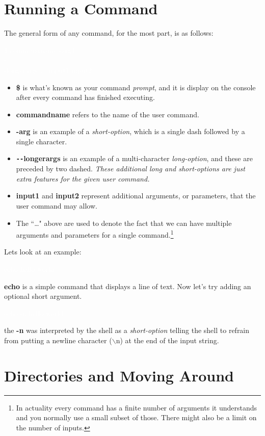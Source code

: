 \documentclass[oneside]{book}
\newcommand{\commandline}[1]{\begin{center} \colorbox{Dark}{\textcolor{white}{#1}} \end{center}}
\begin{document}
\section{Running a Command}
The general form of any command, for the most part, is as follows:
\commandline{\$ commandname -arg1 ... \ \\-\\-longerargs ... input1 input2 ...}
\begin{itemize}
    \item \textbf{\$} is what's known as your command \textit{prompt}, and it is display on the console after every command has finished executing.
    \item \textbf{commandname} refers to the name of the user command.
    \item \textbf{-arg} is an example of a \textit{short-option}, which is a single dash followed by a single character.
    \item \textbf{\texttt{-{}-}longerargs} is an example of a multi-character \textit{long-option}, and these are preceded by two dashed. \textit{These additional long and short-options are just extra features for the given user command.}
    \item \textbf{input1} and \textbf{input2} represent additional arguments, or parameters, that the user command may allow.
    \item The ``\dots" above are used to denote the fact that we can have multiple arguments and parameters for a single command.\footnote{In actuality every command has a finite number of arguments it understands and you normally use a small subset of those. There might also be a limit on the number of inputs.}
\end{itemize}
   
Lets look at an example:
\commandline{echo hello world}

\textbf{echo} is a simple command that displays a line of text. Now let's try adding an optional short argument.

\commandline{echo -n hello world}

the \textbf{-n} was interpreted by the shell as a \textit{short-option} telling the shell to refrain from putting a newline character ($\backslash$n) at the end of the input string.

\section{Directories and Moving Around}
\end{document}
